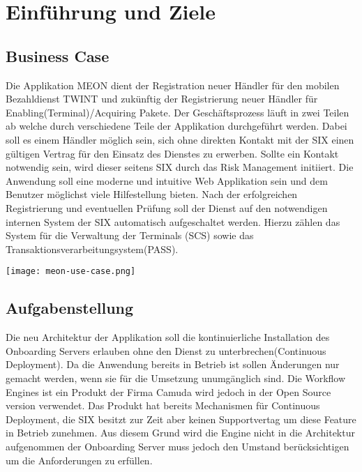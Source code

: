 \graphicspath{{./images/}}


\chapter{Einführung und Ziele}

\section{Business Case}
\label{businesscase}

Die Applikation MEON dient der Registration neuer Händler für den mobilen Bezahldienst TWINT und zukünftig der Registrierung neuer Händler für Enabling(Terminal)/Acquiring Pakete. Der Geschäftsprozess läuft in zwei Teilen ab welche durch verschiedene Teile der Applikation durchgeführt werden.  Dabei soll es einem Händler möglich sein, sich ohne direkten Kontakt mit der SIX einen gültigen Vertrag für den Einsatz des Dienstes zu erwerben. Sollte ein Kontakt notwendig sein, wird dieser seitens SIX durch das Risk Management initiiert.\newline
Die Anwendung soll eine moderne und intuitive Web Applikation sein und dem Benutzer möglichst viele Hilfestellung bieten. Nach der erfolgreichen Registrierung und  eventuellen Prüfung soll der Dienst auf den notwendigen internen System der SIX automatisch aufgeschaltet werden. Hierzu zählen das System für die Verwaltung der Terminals (SCS) sowie das Transaktionsverarbeitungsystem(PASS).

\begin{center}
	\texttt{[image: meon-use-case.png]}
\end{center}

\section{Aufgabenstellung}

Die neu Architektur der Applikation soll die kontinuierliche Installation des Onboarding Servers erlauben ohne den Dienst zu unterbrechen(Continuous Deployment). Da die Anwendung bereits in Betrieb ist sollen Änderungen nur gemacht werden, wenn sie für die Umsetzung unumgänglich sind. \newline Die Workflow Engines ist ein Produkt der Firma Camuda wird jedoch in der Open Source version verwendet. Das Produkt hat bereits Mechanismen für Continuous Deployment, die SIX besitzt zur Zeit aber keinen Supportvertag um diese Feature in Betrieb zunehmen. Aus diesem Grund wird die Engine nicht in die Architektur aufgenommen der Onboarding Server muss jedoch den Umstand berücksichtigen um die Anforderungen zu erfüllen.

